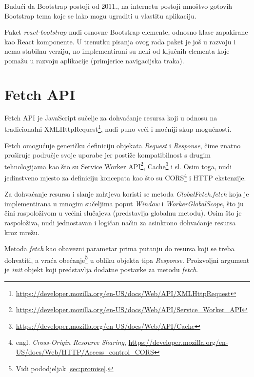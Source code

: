 \documentclass[times, utf8, zavrsni, numeric]{fer}
\newcommand{\razmakp}{\vspace{18pt}}
\begin{document}
Budući da Bootstrap postoji od 2011.\citep{bootstrapWiki}, na internetu postoji mnoštvo gotovih Bootstrap tema koje se lako mogu ugraditi u vlastitu aplikaciju.

\razmakp

Paket \emph{react-bootstrap} nudi osnovne Bootstrap elemente, odnosno klase zapakirane kao React komponente.
U trenutku pisanja ovog rada paket je još u razvoju i nema stabilnu verziju, no implementirani su neki od ključnih elementa koje pomažu u razvoju aplikacije (primjerice navigacijska traka).\citep{bootstrapReact}

\newpage


\section{Fetch API}

Fetch API je JavaScript sučelje za dohvaćanje resursa koji u odnosu na tradicionalni XMLHttpRequest\footnote{\url{https://developer.mozilla.org/en-US/docs/Web/API/XMLHttpRequest}}, nudi puno veći i moćniji skup mogućnosti.

Fetch omogućuje generičku definiciju objekata \emph{Request} i \emph{Response}, čime znatno proširuje područje svoje uporabe jer postiže kompatibilnost s drugim tehnologijama kao što su Service Worker API\footnote{\url{https://developer.mozilla.org/en-US/docs/Web/API/Service_Worker_API}}, Cache\footnote{\url{https://developer.mozilla.org/en-US/docs/Web/API/Cache}} i sl.\citep{MDNFetch}
Osim toga, nudi jedinstveno mjesto za definiciju koncepata kao što su CORS\footnote{engl. \emph{Cross-Origin Resource Sharing}, \url{https://developer.mozilla.org/en-US/docs/Web/HTTP/Access_control_CORS}} i HTTP ekstenzije.

\razmakp

Za dohvaćanje resursa i slanje zahtjeva koristi se metoda \emph{GlobalFetch.fetch} koja je implementirana u mnogim sučeljima poput \emph{Window} i \emph{WorkerGlobalScope}, što ju čini raspoloživom u većini slučajeva (predstavlja globalnu metodu).
Osim što je raspoloživa, nudi jednostavan i logičan način za asinkrono dohvaćanje resursa kroz mrežu.

Metoda \emph{fetch} kao obavezni parametar prima putanju do resursa koji se treba dohvatiti, a vraća obećanje\footnote{Vidi pododjeljak \ref{sec:promise}.} u obliku objekta tipa \emph{Response}.
Proizvoljni argument je \emph{init} objekt koji predstavlja dodatne postavke za metodu \emph{fetch}.\citep{MDNUsingFetch}
\end{document}

